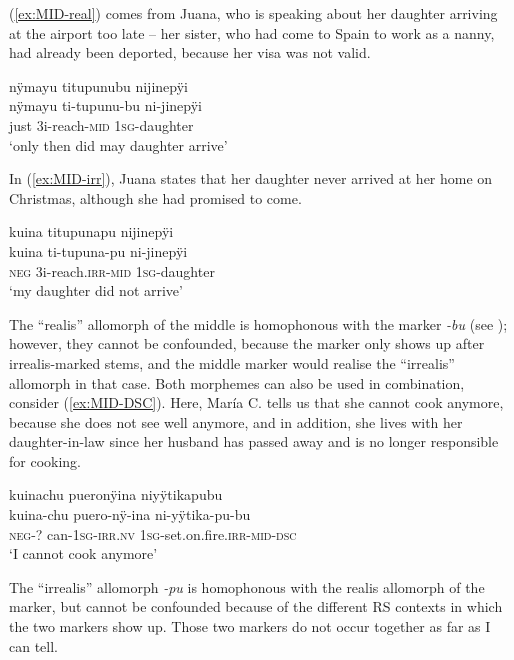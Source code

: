 (\ref{ex:MID-real}) comes from Juana, who is speaking about her daughter arriving at the airport too late – her sister, who had come to Spain to work as a nanny, had already been deported, because her visa was not valid.

\ea\label{ex:MID-real}
\begingl 
\glpreamble nÿmayu titupunubu nijinepÿi\\
\gla nÿmayu ti-tupunu-bu ni-jinepÿi\\ 
\glb just 3i-reach-\textsc{mid} 1\textsc{sg}-daughter\\ 
\glft ‘only then did may daughter arrive’
 \trailingcitation{[jxx-p110923l-1.334]}
\xe

In (\ref{ex:MID-irr}), Juana states that her daughter never arrived at her home on Christmas, although she had promised to come.

\ea\label{ex:MID-irr}
\begingl 
\glpreamble kuina titupunapu nijinepÿi\\
\gla kuina ti-tupuna-pu ni-jinepÿi\\ 
\glb \textsc{neg} 3i-reach.\textsc{irr}-\textsc{mid} 1\textsc{sg}-daughter\\ 
\glft ‘my daughter did not arrive’
 \trailingcitation{[jxx-p120430l-1.305]}
\xe


The “realis” allomorph of the middle is homophonous with the  marker \textit{-bu} (see ); however, they cannot be confounded, because the  marker only shows up after irrealis-marked stems, and the middle marker would realise the “irrealis” allomorph in that case. Both morphemes can also be used in combination, consider (\ref{ex:MID-DSC}). Here, María C. tells us that she cannot cook anymore, because she does not see well anymore, and in addition, she lives with her daughter-in-law since her husband has passed away and is no longer responsible for cooking.

\ea\label{ex:MID-DSC}
\begingl 
\glpreamble kuinachu pueronÿina niyÿtikapubu\\
\gla kuina-chu puero-nÿ-ina ni-yÿtika-pu-bu\\ 
\glb \textsc{neg}-? can-1\textsc{sg}-\textsc{irr.nv} 1\textsc{sg}-set.on.fire.\textsc{irr}-\textsc{mid}-\textsc{dsc}\\ 
\glft ‘I cannot cook anymore’
 \trailingcitation{[cux-c120410ls.106]}
\xe

The “irrealis” allomorph \textit{-pu} is homophonous with the realis allomorph of the  marker, but cannot be confounded because of the different RS contexts in which the two markers show up. Those two markers do not occur together as far as I can tell.


